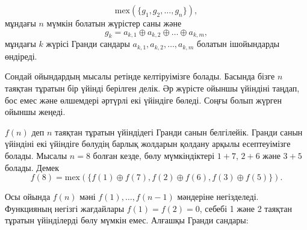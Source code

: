 
\[\textrm{mex}(\{g_1, g_2, \ldots, g_n \}),\]
мұндағы $n$ мүмкін болатын жүрістер саны және
\[g_k = a_{k,1} \oplus a_{k,2} \oplus \ldots \oplus a_{k,m},\]
мұндағы $k$ жүрісі Гранди сандары $a_{k,1},a_{k,2},\ldots,a_{k,m}$ болатын
ішойындарды өндіреді. 


Сондай ойындардың мысалы ретінде  келтіруімізге болады. 
Басында бізге $n$ таяқтан тұратын бір үйінді берілген делік.
Әр жүрісте ойыншы үйіндіні таңдап, бос емес және өлшемдері
әртүрлі екі үйіндіге бөледі. Соңғы болып жүрген 
ойыншы жеңеді. 


$f(n)$ деп $n$ таяқтан тұратын үйіндідегі Гранди санын белгілейік. Гранди санын үйіндіні екі үйіндіге бөлудің барлық жолдарын қолдану арқылы есептеуімізге болады. Мысалы $n=8$ болған кезде,
бөлу мүмкіндіктері $1+7$, $2+6$ және $3+5$ болады.
Демек \[f(8)=\textrm{mex}(\{f(1) \oplus f(7), f(2) \oplus f(6), f(3) \oplus f(5)\}).\]



Осы ойында $f(n)$ мәні $f(1),\ldots,f(n-1)$ мәндеріне
негізделеді. Функцияның негізгі жағдайлары $f(1)=f(2)=0$,
себебі 1 және 2 таяқтан тұратын үйінділерді бөлу мүмкін емес. 
Алғашқы Гранди сандары:

